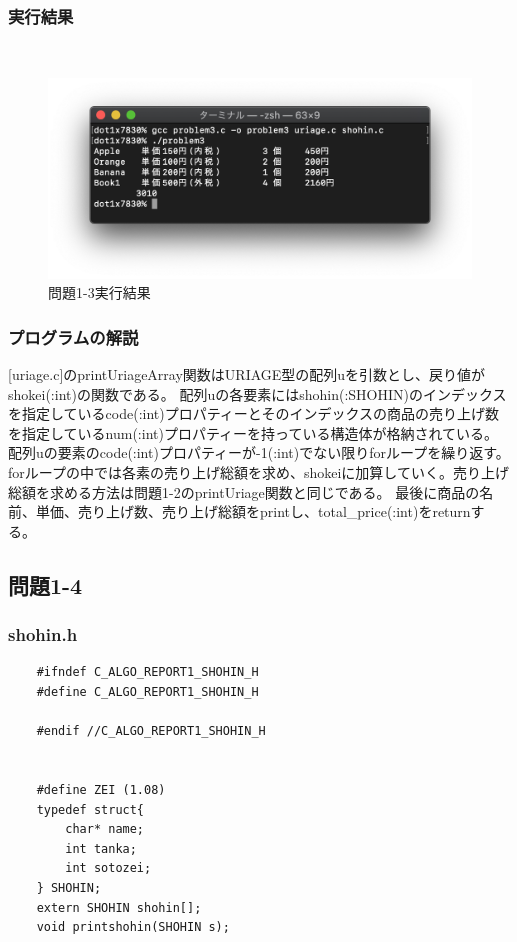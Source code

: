 \documentclass[10pt]{article}
\begin{document}
\subsubsection{実行結果}
　
\begin{figure}[H]
	\centering
	\includegraphics[]{problem1-3.png}
	\caption{問題1-3実行結果}
\end{figure}

\subsubsection{プログラムの解説}
[uriage.c]のprintUriageArray関数はURIAGE型の配列uを引数とし、戻り値がshokei(:int)の関数である。
配列uの各要素にはshohin(:SHOHIN)のインデックスを指定しているcode(:int)プロパティーとそのインデックスの商品の売り上げ数を指定しているnum(:int)プロパティーを持っている構造体が格納されている。\\
配列uの要素のcode(:int)プロパティーが-1(:int)でない限りforループを繰り返す。forループの中では各素の売り上げ総額を求め、shokeiに加算していく。売り上げ総額を求める方法は問題1-2のprintUriage関数と同じである。
最後に商品の名前、単価、売り上げ数、売り上げ総額をprintし、total\_price(:int)をreturnする。
\pagebreak


\subsection{問題1-4}
\subsubsection{shohin.h}
    \begin{lstlisting}
    #ifndef C_ALGO_REPORT1_SHOHIN_H
    #define C_ALGO_REPORT1_SHOHIN_H
    
    #endif //C_ALGO_REPORT1_SHOHIN_H
    
    
    #define ZEI (1.08)
    typedef struct{
        char* name;
        int tanka;
        int sotozei;
    } SHOHIN;
    extern SHOHIN shohin[];
    void printshohin(SHOHIN s);
    \end{lstlisting}
\end{document}
